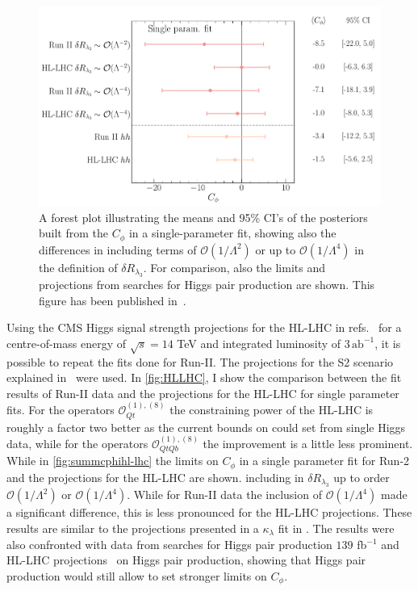 \begin{figure}
	\begin{center}
		\includegraphics[width=0.75\linewidth]{fig/uebeblick_forest_cphi_singleparam}
	\end{center}
	\caption{A forest plot illustrating the means and 95\% CI's of the posteriors built from the  $C_\phi$  in a single-parameter fit, showing also the differences in including terms of $\mathcal{O}(1/\Lambda^2)$ or up to $\mathcal{O}(1/\Lambda^4)$ in the definition of $\delta R_{\lambda_3}$. For comparison, also the limits and projections from searches for Higgs pair production are shown. This figure has been published in~\cite{Alasfar:2022zyr}.  \label{fig:summcphihl-lhc}  }
\end{figure}
Using the CMS Higgs signal strength projections for the HL-LHC in refs.~\cite{CMS-PAS-FTR-18-011,twiki} for a centre-of-mass energy of $\sqrt{s}=14$ TeV and integrated luminosity of $ 3\, \mathrm{ab}^{-1}$, it is possible to repeat the fits done for Run-II.   The projections for the S2 scenario explained in~\cite{Cepeda:2019klc} were used. 
In \autoref{fig:HLLHC}, I show the comparison between the fit results of Run-II data  and the projections for the HL-LHC for single parameter fits. For the operators $\mathcal{O}_{Qt}^{(1),(8)}$ the constraining power of the HL-LHC is roughly a factor two better as the current bounds on could set from single Higgs data, while for the operators $\mathcal{O}_{QtQb}^{(1),(8)}$ the improvement is a little less prominent.
While in \autoref{fig:summcphihl-lhc}  the limits on $C_{\phi}$ in a single parameter fit for Run-2 and the projections for the HL-LHC are shown.
including in $\delta R_{\lambda_3}$ up to order $\mathcal{O}(1/\Lambda^2)$ or $\mathcal{O}(1/\Lambda^4)$. While for Run-II data the inclusion of $\mathcal{O}(1/\Lambda^4)$ made a significant difference, this is less pronounced for the HL-LHC projections. These results are  similar to the projections presented in a $\kappa_{\lambda}$ fit in \cite{DiMicco:2019ngk}. 
The results were also confronted  with data from searches for Higgs pair production $139$ fb$^{-1}$ \cite{ATLAS:2021jki}  and HL-LHC projections~\cite{CMS:2018ccd} on Higgs pair production, showing that Higgs pair production would still allow to set stronger limits on $C_{\phi}$. 
